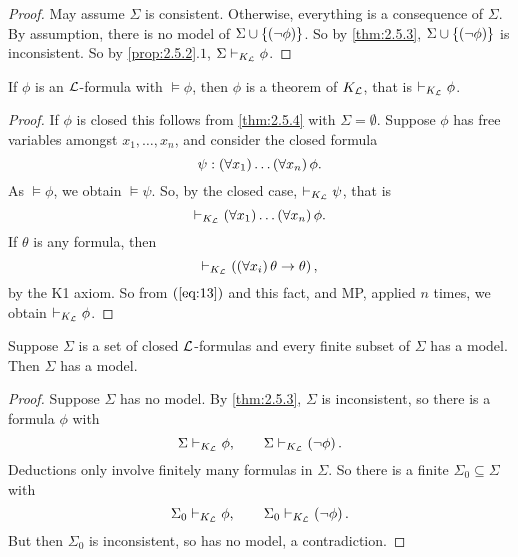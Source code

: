 \begin{proof}
May assume $ \Sigma $ is consistent. Otherwise, everything is a consequence of $ \Sigma $. By assumption, there is no model of $ \Sigma \cup \left\{ \left( \neg \phi \right) \right\} $. So by \ref{thm:2.5.3}, $ \Sigma \cup \left\{ \left( \neg \phi \right) \right\} $ is inconsistent. So by \ref{prop:2.5.2}.$ 1 $, $ \Sigma \vdash_{K_{\mathcal{L}}} \phi $.
\end{proof}

\begin{theorem}
If $ \phi $ is an $ \mathcal{L} $-formula with $ \vDash \phi $, then $ \phi $ is a theorem of $ K_{\mathcal{L}} $, that is $ \vdash_{K_{\mathcal{L}}} \phi $.
\end{theorem}

\begin{proof}
If $ \phi $ is closed this follows from \ref{thm:2.5.4} with $ \Sigma = \emptyset $. Suppose $ \phi $ has free variables amongst $ x_1, \dots, x_n $, and consider the closed formula
$$ \psi : \left( \forall x_1 \right) \dots \left( \forall x_n \right)\phi. $$
As $ \vDash \phi $, we obtain $ \vDash \psi $. So, by the closed case, $ \vdash_{K_{\mathcal{L}}} \psi $, that is
\begin{equation}
\label{eq:13}
\vdash_{K_{\mathcal{L}}} \left( \forall x_1 \right) \dots \left( \forall x_n \right)\phi.
\end{equation}
If $ \theta $ is any formula, then
$$ \vdash_{K_{\mathcal{L}}} \left( \left( \forall x_i \right)\theta \rightarrow \theta \right), $$
by the K1 axiom. So from $ \left( \ref{eq:13} \right) $ and this fact, and MP, applied $ n $ times, we obtain $ \vdash_{K_{\mathcal{L}}} \phi $.
\end{proof}

\begin{corollary}
\label{cor:2.5.6}
Suppose $ \Sigma $ is a set of closed $ \mathcal{L} $-formulas and every finite subset of $ \Sigma $ has a model. Then $ \Sigma $ has a model.
\end{corollary}

\begin{proof}
Suppose $ \Sigma $ has no model. By \ref{thm:2.5.3}, $ \Sigma $ is inconsistent, so there is a formula $ \phi $ with
$$ \Sigma \vdash_{K_{\mathcal{L}}} \phi, \qquad \Sigma \vdash_{K_{\mathcal{L}}} \left( \neg \phi \right). $$ Deductions only involve finitely many formulas in $ \Sigma $. So there is a finite $ \Sigma_0 \subseteq \Sigma $ with
$$ \Sigma_0 \vdash_{K_{\mathcal{L}}} \phi, \qquad \Sigma_0 \vdash_{K_{\mathcal{L}}} \left( \neg \phi \right). $$
But then $ \Sigma_0 $ is inconsistent, so has no model, a contradiction.
\end{proof}

